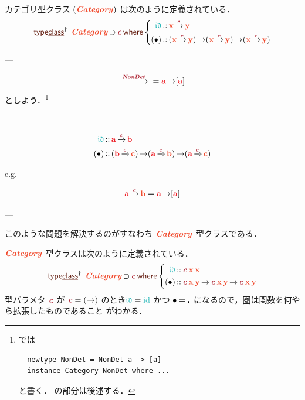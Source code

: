 \documentclass[a5paper,twoside,fleqn,draft]{jsbook}
\begin{document}
カテゴリ型クラス $(\mCatTypeClass)$ は次のように定義されている．
\begin{equation}
  \mTypeClassDeclPolymorphic\;
  \mCatTypeClass\hHasElementsOf\mTypeConstructor{c}
  \mWhere\left\{
  \begin{aligned}
    \mIdCat
    &\hIsTypeOf\mX\mCatArrowC\mY\\
    (\mCompCat)
    &\hIsTypeOf{}(\mX\mCatArrowC\mY)\hFunctionArrow(\mX\mCatArrowC\mY)\hFunctionArrow(\mX\mCatArrowC\mY)
  \end{aligned}
  \right.
\end{equation}

---

\begin{equation}
  \mCatArrow{\mTypeConstructor{NonDet}}{}
  =\hTypeName{a}\hFunctionArrow\hListConstruct{\hTypeName{a}}
\end{equation}
としよう．\footnote{\haskell では
\begin{verbatim}
  newtype NonDet = NonDet a -> [a]
  instance Category NonDet where ...
\end{verbatim}
と書く． の部分は後述する．}

---

\begin{align}
  \mIdCat
  &\hIsTypeOf{}\hTypeName{a}\mCatArrowC\hTypeName{b}\\
  (\mCompCat)
  &\hIsTypeOf{}(\hTypeName{b}\mCatArrowC\mC)
  \hFunctionArrow(\hTypeName{a}\mCatArrowC\mB)
  \hFunctionArrow(\hTypeName{a}\mCatArrowC\mC)
\end{align}

e.g.

\begin{equation}
  \hTypeName{a}\mCatArrowC\mB
  =\hTypeName{a}\hFunctionArrow\hListConstruct{\hTypeName{a}}
\end{equation}

---


このような問題を解決するのがすなわち
$\mCatTypeClass$ 型クラスである．

$\mCatTypeClass$ 型クラスは次のように定義されている．
\begin{equation}
  \mTypeClassDeclPolymorphic\;
  \mCatTypeClass\hHasElementsOf\mTypeConstructor{c}
  \mWhere\left\{
  \begin{aligned}
    \mIdCat&\hIsTypeOf\mTypeConstructor{c}\,\mX\,\mX\\
    (\mCompCat)
    &\hIsTypeOf\mTypeConstructor{c}\,\mX\,\mY
    \hFunctionArrow\mTypeConstructor{c}\,\mX\,\mY
    \hFunctionArrow\mTypeConstructor{c}\,\mX\,\mY
  \end{aligned}
  \right.
\end{equation}
型パラメタ $\mTypeConstructor{c}$ が
$\mTypeConstructor{c}=(\hFunctionArrow)$ のとき$\mIdCat=\mId$ かつ
$\operatorname{\bullet}=\operatorname{\centerdot}$ になるので，圏は関数を何やら拡張したものであること
がわかる．
\end{document}
